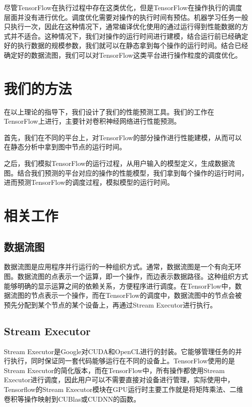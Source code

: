     尽管TensorFlow在执行过程中存在这类优化，但是TensorFlow在操作执行的调度层面并没有进行优化。调度优化需要对操作的执行时间有预估。机器学习任务一般只执行一次，因此在这种情况下，通常编译优化使用的通过运行得到性能数据的方式并不适合。这种情况下，我们对操作的运行时间进行建模，结合运行前已经确定好的执行数据的规模参数，我们就可以在静态拿到每个操作的运行时间。结合已经确定好的数据流图，我们可以对TensorFlow这类平台进行操作粒度的调度优化。

\section{我们的方法}
    在以上理论的指导下，我们设计了我们的性能预测工具。我们的工作在TensorFlow上进行，主要针对卷积神经网络进行性能预测。
    
    首先，我们在不同的平台上，对TensorFlow的部分操作进行性能建模，从而可以在静态分析中拿到图中节点的运行时间。

    之后，我们模拟TensorFlow的运行过程，从用户输入的模型定义，生成数据流图。结合我们预测的平台对应的操作的性能模型，我们拿到每个操作的运行时间，进而预测TensorFlow的调度过程，模拟模型的运行时间。

\section{相关工作}
\subsection{数据流图}
    数据流图是应用程序并行运行的一种组织方式。通常，数据流图是一个有向无环图。数据流图的点表示一个运算，即一个操作，而边表示数据路径。这种组织方式能够明确的显示运算之间的依赖关系，方便程序进行调度。在TensorFlow中，数据流图的节点表示一个操作，而在TensorFlow的调度中，数据流图中的节点会被预先分配到某个节点的某个设备上，再通过Stream Executor进行执行。

\subsection{Stream Executor}
    Stream Executor是Google对CUDA和OpenCL进行的封装。它能够管理任务的并行执行，同时保证同一套代码能够运行在不同的设备上。TensorFlow使用的是Stream Executor的简化版本，而在TensorFlow中，所有操作都使用Stream Executor进行调度，因此用户可以不需要直接对设备进行管理，实际使用中，Tensorflow的Stream Executor模块在GPU运行时主要工作就是将矩阵乘法、二维卷积等操作映射到CUBlas或CUDNN\cite{cudnn}的函数。
    